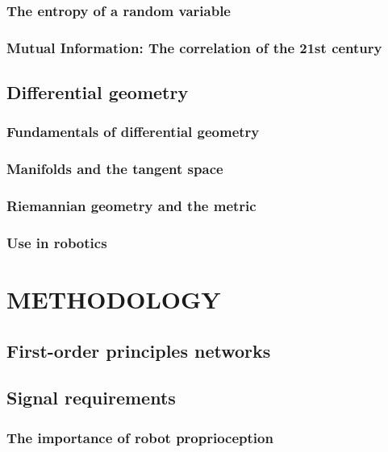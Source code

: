\documentclass{article}
\begin{document}
\subsubsection{The entropy of a random variable}
\subsubsection{Mutual Information: The correlation of the 21st century }
\subsection{Differential geometry}
\subsubsection{Fundamentals of differential geometry}
\subsubsection{Manifolds and the tangent space}
\subsubsection{Riemannian geometry and the metric}
\subsubsection{Use in robotics}

\section{METHODOLOGY}
\subsection{First-order principles networks}
\subsection{Signal requirements}
\subsubsection{The importance of robot proprioception}
\end{document}
